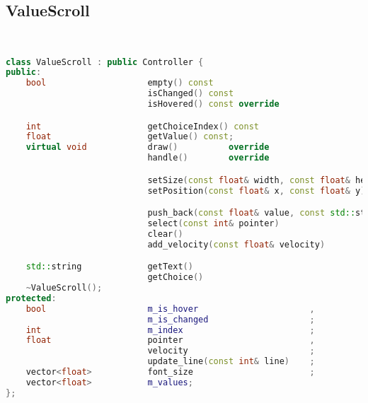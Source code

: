 \subsection{ValueScroll}
\begin{lstlisting}[language=C++]


class ValueScroll : public Controller {
public:
    bool                    empty() const                                                   ,
                            isChanged() const                                               ,
                            isHovered() const override                                      ;

    int                     getChoiceIndex() const                                          ;
    float                   getValue() const;
    virtual void            draw()          override                                        ,
                            handle()        override                                        , 

                            setSize(const float& width, const float& height) override       ,
                            setPosition(const float& x, const float& y) override            ,

                            push_back(const float& value, const std::string& str)           ,
                            select(const int& pointer)                                      ,
                            clear()                                                         ,
                            add_velocity(const float& velocity)                             ;

    std::string             getText()                                                       ,
                            getChoice()                                                     ;
    ~ValueScroll();
protected:
    bool                    m_is_hover                      ,
                            m_is_changed                    ;
    int                     m_index                         ;
    float                   pointer                         ,
                            velocity                        ;
                            update_line(const int& line)    ;
    vector<float>           font_size                       ;
    vector<float>           m_values;
};





\end{lstlisting}
